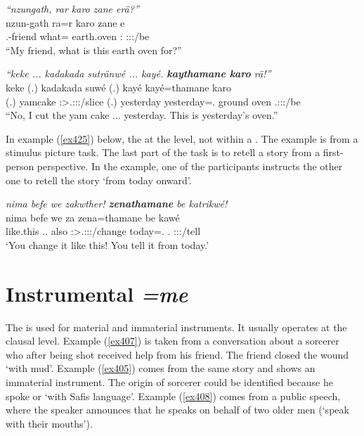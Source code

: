 \begin{exe}
\ex \label{ex422}
\begin{xlist}
	\ex \emph{``nzungath, rar karo zane erä?''}\\
	\gll nzun-gath ra=r {karo} zane e\\
	\Fsg.\Poss-friend what=\Purp{} {earth.oven} \Dem:\Prox{} \Stpl:\Sbj:\Nonpast:\Ipfv/be\\
	\trans ``My friend, what is this earth oven for?''
	\label{ex423}

	\ex \emph{``keke ... kadakada sutränwé ... kayé. \textbf{kaythamane karo} rä!''}\\
	\gll keke (.) {kadakada} suwé (.) kayé kayé=thamane karo \\
	\Neg{} (.) {yamcake} \Fsg:\Sbj>\Tsg.\Masc:\Obj:\Rpst:\Ipfv/slice (.) yesterday yesterday=\Temp.\Poss{} {ground oven} \Tsg.\F:\Sbj:\Nonpast:\Ipfv/be\\
	\trans ``No, I cut the yam cake ... yesterday. This is yesterday's oven.''\\
	\label{ex424}
\end{xlist}
\end{exe}
	
In example (\ref{ex425}) below, the    at the  level, not within a . The example is from a stimulus picture task. The last part of the task is to retell a story from a first-person perspective. In the example, one of the participants instructs the other one to retell the story `from today onward'.

\begin{exe}
	\ex \emph{nima befe we zakwther! \textbf{zenathamane} be katrikwé!}\\
	\gll nima befe we za zena=thamane be kawé\\
	{like.this} \Ssg.\Erg.\Emph{} also \Ssg:\Sbj>\Tsg.\F:\Obj:\Imp:\Pfv/change today=\Temp.\Poss{} \Ssg.\Erg{} \Ssg:\Sbj:\Imp:\Ipfv/tell\\
	\trans `You change it like this! You tell it from today.'
	\label{ex425}
\end{exe}

\section{Instrumental \emph{=me}} \label{inscase}

The   is used for material and immaterial instruments. It usually operates at the clausal level. Example (\ref{ex407}) is taken from a conversation about a sorcerer who \textendash{} after being shot \textendash{} received help from his friend. The friend closed the wound `with mud'. Example (\ref{ex405}) comes from the same story and shows an immaterial instrument. The origin of sorcerer could be identified because he spoke  or `with Safis language'. Example (\ref{ex408}) comes from a public speech, where the speaker announces that he speaks on behalf of two older men (`speak with their mouths').

